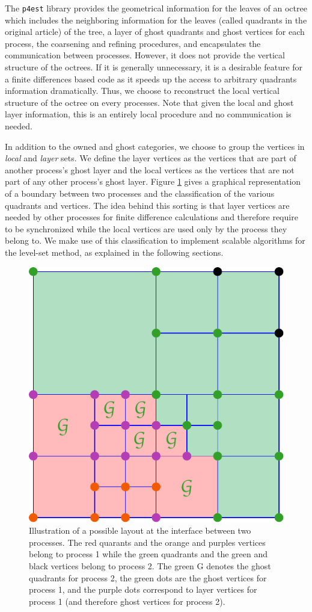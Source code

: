 The \texttt{p4est} library provides the geometrical information for the leaves of an octree which includes the neighboring information for the leaves (called quadrants in the original article) of the tree, a layer of ghost quadrants and ghost vertices for each process, the coarsening and refining procedures, and encapsulates the communication between processes. However, it does not provide the vertical structure of the octrees. If it is generally unnecessary, it is a desirable feature for a finite differences based code as it speeds up the access to arbitrary quadrants information dramatically. Thus, we choose to reconstruct the local vertical structure of the octree on every processes. Note that given the local and ghost layer information, this is an entirely local procedure and no communication is needed.

In addition to the owned and ghost categories, we choose to group the vertices in \textit{local} and \textit{layer} sets. We define the layer vertices as the vertices that are part of another process's ghost layer and the local vertices as the vertices that are not part of any other process's ghost layer. Figure \ref{fig::local_layer_vertices} gives a graphical representation of a boundary between two processes and the classification of the various quadrants and vertices. The idea behind this sorting is that layer vertices are needed by other processes for finite difference calculations and therefore require to be synchronized while the local vertices are used only by the process they belong to. We make use of this classification to implement scalable algorithms for the level-set method, as explained in the following sections.

\begin{figure}[ht!]
\begin{center}
\includegraphics[width=.4\textwidth]{pictures/layer_nodes.pdf}
\caption{Illustration of a possible layout at the interface between two processes. The red quarants and the orange and purples vertices belong to process 1 while the green quadrants and the green and black vertices belong to process 2. The green G denotes the ghost quadrants for process 2, the green dots are the ghost vertices for process 1, and the purple dots correspond to layer vertices for process 1 (and therefore ghost vertices for process 2).} \label{fig::local_layer_vertices}
\end{center}
\end{figure}